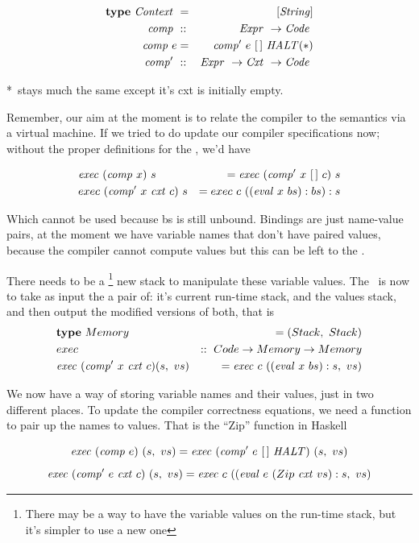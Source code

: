 \documentclass {article}
\begin{document}
\begin{eqnarray*}
	\textbf{type}\  \mathit{Context\ } &=& [\mathit{String}] \\
	\mathit{comp\ } &::& \mathit{Expr\ } \rightarrow \mathit{Code\ } \\
	\mathit{comp\ } e &=& \mathit{comp'\ }  e\ [\,]\ \mathit{HALT} (*)\\
	\mathit{comp'\ } &::& \mathit{Expr\ } \rightarrow \mathit{Cxt\ } \rightarrow \mathit{Code\ }
\end{eqnarray*}

*\comp\ stays much the same except it's cxt
	is initially empty.

Remember, our aim at the moment
is to relate the compiler to the
semantics via a virtual machine.
If we tried to do update our compiler 
specifications now; 
without the proper definitions
for the \vm, we'd have

\begin{eqnarray*}
&\mathit{exec\ } (\mathit{comp\ } x)\ s  
	&= \mathit{exec\ } (\mathit{comp'\ }  x\ [\,]\ c)\ s  \\
&exec\ (\mathit{comp'\ }  x\ \mathit{cxt\ } c)\ s  
	&= exec\ c\ ((\mathit{eval\ }  x\ bs) : bs) : s
\end{eqnarray*}

Which cannot be used
because bs is still unbound.
Bindings are just name-value pairs,
at the moment we have variable names
that don't have paired values,
because the compiler cannot compute values
but this can be left to the \vm.

There needs to be a \footnote{
There may be a way to have the variable values
on the run-time stack, but it's
simpler to use a new one}
new stack to
manipulate these variable values.
The \vm\ is now to take as input
the a pair of:
it's current run-time stack,
and the values stack,
and then output the modified versions of both,
that is
\begin{eqnarray}
&\textbf{type}\ Memory\ &= (Stack,\ Stack)\\
&exec &::\ Code \rightarrow Memory \rightarrow Memory \nonumber \\
&\mathit{exec\ } (\mathit{comp'\ }  x\ \mathit{cxt\ } c) (s,\ vs) 
	&= \mathit{exec\ } c\ ((\mathit{eval\ }  x\ bs):s,\ vs) \label{spec4}
\end{eqnarray}

We now have a way of storing variable names
and their values, 
just in two different places.
To update the compiler correctness equations,
we need a function to pair up the names
to values.
That is the ``Zip'' function in Haskell

	\[ \mathit{exec\ } (\mathit{comp\ } e)\ (s,\ vs) 
		= \mathit{exec\ } (\mathit{comp'\ }  e\ [\,]\ \mathit{HALT})\ (s,\ vs) \]
	\[ \mathit{exec\ } (\mathit{comp'\ }  e\ \mathit{cxt\ } c)\ (s,\ vs) 
		= \mathit{exec\ } c\ ((\mathit{eval\ }  e\ (Zip\ \mathit{cxt\ } vs):s,\ vs) \]
\end{document}
